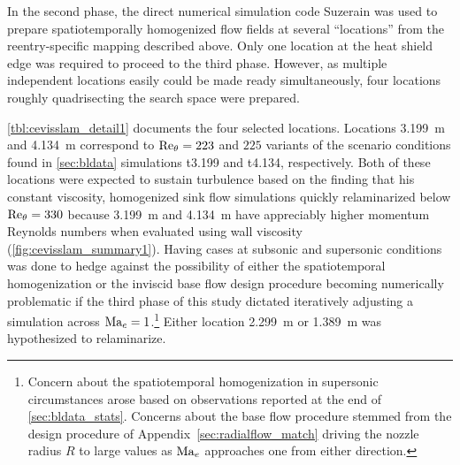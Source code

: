 


In the second phase, the direct numerical simulation code Suzerain was used to
prepare spatiotemporally homogenized flow fields at several ``locations'' from
the reentry-specific mapping described above.  Only one
location at the heat shield edge was required to proceed to the third phase.
%
However, as multiple independent locations easily could be made ready
simultaneously, four locations roughly quadrisecting the search space were
prepared.

\autoref{tbl:cevisslam_detail1} documents the four selected locations.
%
Locations 3.199~m and 4.134~m correspond to $\Reynolds[\theta]{}=223$ and
$225$ variants of the scenario conditions found in \autoref{sec:bldata}
simulations t3.199 and t4.134, respectively.
%
Both of these locations were expected to sustain turbulence based on the
\citet[\textsection{}3.2]{Spalart1988Direct} finding that his constant
viscosity, homogenized sink flow simulations quickly relaminarized below
$\Reynolds[\theta]{}=330$ because 3.199~m and 4.134~m have appreciably higher
momentum Reynolds numbers when evaluated using wall viscosity
(\autoref{fig:cevisslam_summary1}).
%
Having cases at subsonic and supersonic conditions was done to hedge against the
possibility of either the spatiotemporal homogenization or the inviscid base
flow design procedure becoming numerically problematic if the third phase of
this study dictated iteratively adjusting a simulation across
$\Mach[e]{}=1$.\footnote{%
    Concern about the spatiotemporal homogenization in supersonic circumstances
    arose based on observations reported at the end of
    \autoref{sec:bldata_stats}.  Concerns about the base flow procedure stemmed
    from the design procedure of Appendix~\ref{sec:radialflow_match} driving the
    nozzle radius $R$ to large values as $\Mach[e]$ approaches one from either
    direction.
}
%
Either location 2.299~m or 1.389~m was hypothesized to relaminarize.

